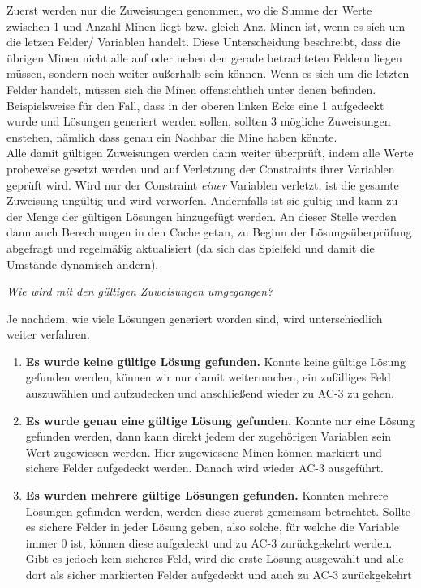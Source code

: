 Zuerst werden nur die Zuweisungen genommen, wo die Summe der Werte zwischen 1 und Anzahl Minen liegt bzw. gleich Anz. Minen ist, wenn es
sich um die letzen Felder/ Variablen handelt. Diese Unterscheidung beschreibt, dass die übrigen Minen nicht alle auf oder neben den gerade
betrachteten Feldern liegen müssen, sondern noch weiter außerhalb sein können. Wenn es sich um die letzten Felder handelt, müssen sich die
Minen offensichtlich unter denen befinden. Beispielsweise für den Fall, dass in der oberen linken Ecke eine 1 aufgedeckt wurde und Lösungen
generiert werden sollen, sollten 3 mögliche Zuweisungen enstehen, nämlich dass genau ein Nachbar die Mine haben könnte.\\
Alle damit gültigen Zuweisungen werden dann weiter überprüft, indem alle Werte probeweise gesetzt werden und auf Verletzung der Constraints
ihrer Variablen geprüft wird. Wird nur der Constraint \textit{einer} Variablen verletzt, ist die gesamte Zuweisung ungültig und wird verworfen.
Andernfalls ist sie gültig und kann zu der Menge der gültigen Lösungen hinzugefügt werden. An dieser Stelle werden dann auch Berechnungen
in den Cache getan, zu Beginn der Lösungsüberprüfung abgefragt und regelmäßig aktualisiert (da sich das Spielfeld und damit die Umstände
dynamisch ändern).

\textit{Wie wird mit den gültigen Zuweisungen umgegangen?}

Je nachdem, wie viele Lösungen generiert worden sind, wird unterschiedlich weiter verfahren.
\begin{enumerate}
    \item \textbf{Es wurde keine gültige Lösung gefunden.} Konnte keine gültige Lösung gefunden werden, können wir nur damit weitermachen,
    ein zufälliges Feld auszuwählen und aufzudecken und anschließend wieder zu AC-3 zu gehen.
    \item \textbf{Es wurde genau eine gültige Lösung gefunden.} Konnte nur eine Lösung gefunden werden, dann kann direkt jedem der zugehörigen
    Variablen sein Wert zugewiesen werden. Hier zugewiesene Minen können markiert und sichere Felder aufgedeckt werden. Danach wird wieder
    AC-3 ausgeführt. 
    \item \textbf{Es wurden mehrere gültige Lösungen gefunden.} Konnten mehrere Lösungen gefunden werden, werden diese zuerst gemeinsam betrachtet.
    Sollte es sichere Felder in jeder Lösung geben, also solche, für welche die Variable immer 0 ist, können diese aufgedeckt und zu AC-3
    zurückgekehrt werden. Gibt es jedoch kein sicheres Feld, wird die erste Lösung ausgewählt und alle dort als sicher markierten Felder
    aufgedeckt und auch zu AC-3 zurückgekehrt
\end{enumerate}

